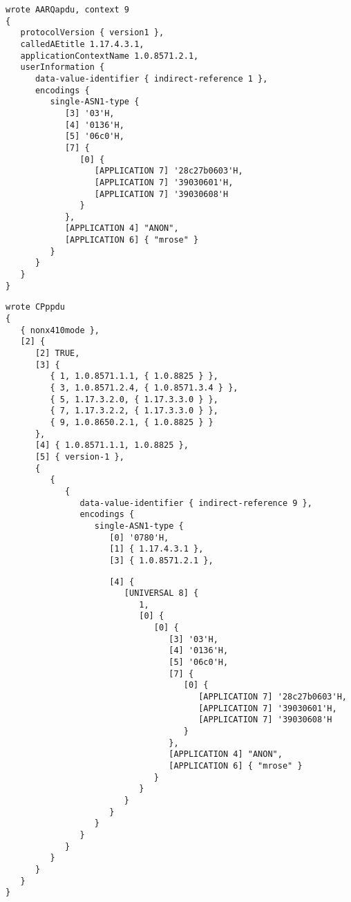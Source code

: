 \begin{bwslide}\small
\begin{verbatim}
wrote AARQapdu, context 9
{
   protocolVersion { version1 },
   calledAEtitle 1.17.4.3.1,
   applicationContextName 1.0.8571.2.1,
   userInformation {
      data-value-identifier { indirect-reference 1 },
      encodings {
         single-ASN1-type {
            [3] '03'H,
            [4] '0136'H,
            [5] '06c0'H,
            [7] {
               [0] {
                  [APPLICATION 7] '28c27b0603'H,
                  [APPLICATION 7] '39030601'H,
                  [APPLICATION 7] '39030608'H
               }
            },
            [APPLICATION 4] "ANON",
            [APPLICATION 6] { "mrose" }
         }
      }
   }
}
\end{verbatim}
\end{bwslide}


\begin{bwslide}\small
\begin{verbatim}
wrote CPppdu
{
   { nonx410mode },
   [2] {
      [2] TRUE,
      [3] {
         { 1, 1.0.8571.1.1, { 1.0.8825 } },
         { 3, 1.0.8571.2.4, { 1.0.8571.3.4 } },
         { 5, 1.17.3.2.0, { 1.17.3.3.0 } },
         { 7, 1.17.3.2.2, { 1.17.3.3.0 } },
         { 9, 1.0.8650.2.1, { 1.0.8825 } }
      },
      [4] { 1.0.8571.1.1, 1.0.8825 },
      [5] { version-1 },
      {
         {
            {
               data-value-identifier { indirect-reference 9 },
               encodings {
                  single-ASN1-type {
                     [0] '0780'H,
                     [1] { 1.17.4.3.1 },
                     [3] { 1.0.8571.2.1 },
\end{verbatim}
\end{bwslide}


\begin{bwslide}\small
\begin{verbatim}
                     [4] {
                        [UNIVERSAL 8] {
                           1,
                           [0] {
                              [0] {
                                 [3] '03'H,
                                 [4] '0136'H,
                                 [5] '06c0'H,
                                 [7] {
                                    [0] {
                                       [APPLICATION 7] '28c27b0603'H,
                                       [APPLICATION 7] '39030601'H,
                                       [APPLICATION 7] '39030608'H
                                    }
                                 },
                                 [APPLICATION 4] "ANON",
                                 [APPLICATION 6] { "mrose" }
                              }
                           }
                        }
                     }
                  }
               }
            }
         }
      }
   }
}
\end{verbatim}
\end{bwslide}


